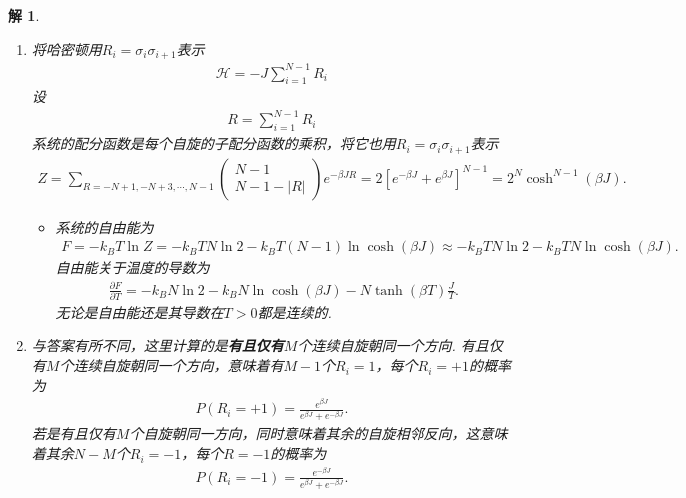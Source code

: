 \documentclass[UTF8,10pt,a4paper]{article}
\theoremstyle{Problem}
\theoremstyle{Solution}
\newtheorem*{sol}{解}
\providecommand{\abs}[1]{\left\lvert#1\right\rvert}
\begin{document}
\begin{sol}
    \begin{enumerate}
        \item[(a)] 将哈密顿用$R_i=\sigma_i\sigma_{i+1}$表示
        \begin{align}
            \mathcal{H}=-J\sum_{i=1}^{N-1}R_i
        \end{align}
        设
        \begin{align}
            R=\sum_{i=1}^{N-1}R_i
        \end{align}
        系统的配分函数是每个自旋的子配分函数的乘积，将它也用$R_i=\sigma_i\sigma_{i+1}$表示
        \begin{align}
            Z=\sum_{R=-N+1,-N+3,\cdots,N-1}\left(\begin{matrix}
                N-1\\
                N-1-\abs{R}
            \end{matrix}\right)e^{-\beta JR}=2\left[e^{-\beta J}+e^{\beta J}\right]^{N-1}=2^N\cosh^{N-1}(\beta J).
        \end{align}
        \begin{itemize}
            \item[$\triangleright$] 系统的自由能为
            \begin{align}
                F=-k_BT\ln Z=-k_BTN\ln 2-k_BT(N-1)\ln\cosh(\beta J)\approx-k_BTN\ln 2-k_BTN\ln\cosh(\beta J).
            \end{align}
            自由能关于温度的导数为
            \begin{align}
                \frac{\partial F}{\partial T}=-k_BN\ln 2-k_BN\ln\cosh(\beta J)-N\tanh(\beta T)\frac{J}{T}.
            \end{align}
            无论是自由能还是其导数在$T>0$都是连续的.
        \end{itemize}
        \item[(b)] 与答案有所不同，这里计算的是\textbf{有且仅有}$M$个连续自旋朝同一个方向. 有且仅有$M$个连续自旋朝同一个方向，意味着有$M-1$个$R_i=1$，每个$R_i=+1$的概率为
        \begin{align}
            P(R_i=+1)=\frac{e^{\beta J}}{e^{\beta J}+e^{-\beta J}}.
        \end{align}
        若是有且仅有$M$个自旋朝同一方向，同时意味着其余的自旋相邻反向，这意味着其余$N-M$个$R_i=-1$，每个$R=-1$的概率为
        \begin{align}
            P(R_i=-1)=\frac{e^{-\beta J}}{e^{\beta J}+e^{-\beta J}}.
        \end{align}

\end{enumerate}
\end{sol}
\end{document}
